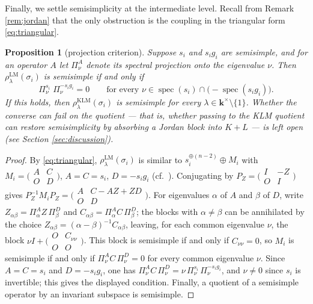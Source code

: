 \documentclass[11pt]{article}
\newtheorem{proposition}[theorem]{Proposition}
\theoremstyle{definition}
\theoremstyle{remark}
\newcommand{\spec}{\operatorname{spec}}
\newcommand{\kk}{\boldsymbol{k}}
\newcommand{\rLMl}{\rho^{\mathrm{LM}}_{\lambda}}
\newcommand{\rKLM}{\rho^{\mathrm{KLM}}_{\lambda}}
\begin{document}
Finally, we settle semisimplicity at the intermediate level. Recall
from Remark \ref{rem:jordan} that the only obstruction is the coupling
in the triangular form \eqref{eq:triangular}.

\begin{proposition}[projection criterion]\label{prop:projection}
Suppose $s_i$ and $s_i g_i$ are semisimple, and for an operator $A$ let
$\Pi^{A}_{\nu}$ denote its spectral projection onto the eigenvalue
$\nu$. Then $\rLMl(\sigma_i)$ is semisimple if and only if
\[
\Pi^{s_i}_{\nu}\; \Pi^{-s_i g_i}_{\nu} = 0
\qquad \text{for every } \nu \in \spec(s_i) \cap
\bigl(-\spec(s_i g_i)\bigr).
\]
If this holds, then $\rKLM(\sigma_i)$ is semisimple for every
$\lambda \in \kk^{\times} \setminus \{1\}$. Whether the converse can
fail on the quotient --- that is, whether passing to the KLM quotient
can restore semisimplicity by absorbing a Jordan block into $K + L$ ---
is left open (see Section \ref{sec:discussion}).
\end{proposition}

\begin{proof}
By \eqref{eq:triangular}, $\rLMl(\sigma_i)$ is similar to
$s_i^{\oplus(n-2)} \oplus M_i$ with
$M_i = \bigl(\begin{smallmatrix} A & C \\ O & D \end{smallmatrix}\bigr)$,
$A = C = s_i$, $D = -s_i g_i$ (cf.\ \cite{Roth52}). Conjugating by
$P_Z = \bigl(\begin{smallmatrix} I & -Z \\ O & I \end{smallmatrix}\bigr)$
gives
$P_Z^{-1} M_i P_Z = \bigl(\begin{smallmatrix} A & C - AZ + ZD \\
O & D \end{smallmatrix}\bigr)$.
For eigenvalues $\alpha$ of $A$ and $\beta$ of $D$, write
$Z_{\alpha\beta} = \Pi^{A}_{\alpha} Z\, \Pi^{D}_{\beta}$ and
$C_{\alpha\beta} = \Pi^{A}_{\alpha} C\, \Pi^{D}_{\beta}$; the blocks
with $\alpha \neq \beta$ can be annihilated by the choice
$Z_{\alpha\beta} = (\alpha - \beta)^{-1} C_{\alpha\beta}$, leaving, for
each common eigenvalue $\nu$, the block
$\nu I + \bigl(\begin{smallmatrix} O & C_{\nu\nu} \\ O & O
\end{smallmatrix}\bigr)$. This block is semisimple if and only if
$C_{\nu\nu} = 0$, so $M_i$ is semisimple if and only if
$\Pi^{A}_{\nu} C\, \Pi^{D}_{\nu} = 0$ for every common eigenvalue
$\nu$. Since $A = C = s_i$ and $D = -s_i g_i$, one has
$\Pi^{A}_{\nu} C\, \Pi^{D}_{\nu}
= \nu\, \Pi^{s_i}_{\nu}\, \Pi^{-s_i g_i}_{\nu}$, and $\nu \neq 0$
since $s_i$ is invertible; this gives the displayed condition. Finally,
a quotient of a semisimple operator by an invariant subspace is
semisimple.
\end{proof}
\end{document}
